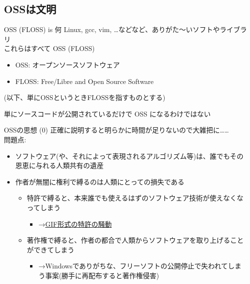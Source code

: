 \documentclass[
        unicode%
    ]{beamer}
\begin{document}
\subsection{OSSは文明}

\begin{frame}{OSS (FLOSS) is 何}
    Linux, gcc, vim, \ldots などなど、ありがた〜いソフトやライブラリ \\
    これらはすべて \alert{OSS} (FLOSS)

    \begin{itemize}
        \item OSS: オープンソースソフトウェア
        \item FLOSS: Free/Libre and Open Source Software
    \end{itemize}

    {\small (以下、単にOSSというときFLOSSを指すものとする)}
    \vspace*{\baselineskip}

    単にソースコードが公開されているだけで OSS になるわけではない
\end{frame}

\begin{frame}{OSSの思想 (0)}
    正確に説明すると明らかに時間が足りないので大雑把に……\\

    問題点:

    \begin{itemize}
        \pause
        \item ソフトウェア(や、それによって表現されるアルゴリズム等)は、誰でもその恩恵に与れる人類共有の遺産
        \pause
        \item 作者が無闇に権利で縛るのは人類にとっての損失である
            \begin{itemize}
                \pause
                \item 特許で縛ると、本来誰でも使えるはずのソフトウェア技術が使えなくなってしまう
                    \begin{itemize}
                        \item →\href{https://ja.wikipedia.org/wiki/Graphics_Interchange_Format\#.E7.89.B9.E8.A8.B1.E5.95.8F.E9.A1.8C.E3.81.A8.E3.81.9D.E3.81.AE.E9.A1.9B.E6.9C.AB}{GIF形式の特許の騒動}
                    \end{itemize}
                \pause
                \item 著作権で縛ると、作者の都合で人類からソフトウェアを取り上げることができてしまう
                    \begin{itemize}
                        \item →Windowsでありがちな、フリーソフトの公開停止で失われてしまう事案(勝手に再配布すると著作権侵害)
                    \end{itemize}
            \end{itemize}
    \end{itemize}
\end{frame}
\end{document}
